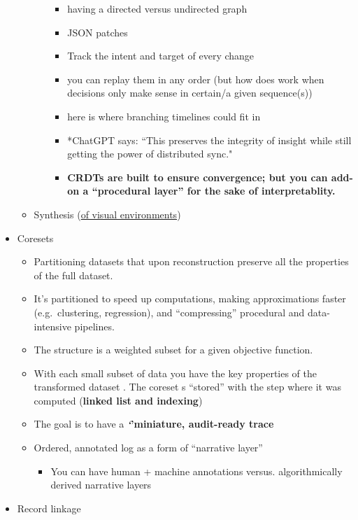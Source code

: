 \documentclass[
]{article}
\providecommand{\tightlist}{%
  \setlength{\itemsep}{0pt}\setlength{\parskip}{0pt}}\usepackage{longtable,booktabs,array}
\begin{document}
\begin{itemize}
\begin{itemize}
\begin{itemize}
      \begin{itemize}
      \item
        having a directed versus undirected graph
      \item
        JSON patches
      \item
        Track the intent and target of every change
      \item
        you can replay them in any order (but how does work when
        decisions only make sense in certain/a given sequence(s))
      \item
        here is where branching timelines could fit in
      \end{itemize}

      \begin{itemize}
      \item
        *ChatGPT says: ``This preserves the integrity of insight while
        still getting the power of distributed sync."
      \item
        \textbf{CRDTs are built to ensure convergence; but you can
        add-on a ``procedural layer'' for the sake of interpretablity.}
      \end{itemize}
    \end{itemize}
  \item
    Synthesis (\href{https://core.ac.uk/download/pdf/29195125.pdf}{of
    visual environments})
  \end{itemize}
\item
  Coresets

  \begin{itemize}
  \item
    Partitioning datasets that upon reconstruction preserve all the
    properties of the full dataset.
  \item
    It's partitioned to speed up computations, making approximations
    faster (e.g.~clustering, regression), and ``compressing'' procedural
    and data-intensive pipelines.
  \item
    The structure is a weighted subset for a given objective function.
  \item
    With each small subset of data you have the key properties of the
    transformed dataset . The coreset s ``stored'' with the step where
    it was computed (\textbf{linked list and indexing})
  \item
    The goal is to have a \textbf{\emph{`}'miniature, audit-ready trace}
  \item
    Ordered, annotated log as a form of ``narrative layer''

    \begin{itemize}
    \tightlist
    \item
      You can have human + machine annotations versus. algorithmically
      derived narrative layers
    \end{itemize}
  \end{itemize}
\item
  Record linkage
\end{itemize}
\end{document}
